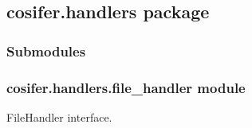 \documentclass[letterpaper,10pt,english]{sphinxmanual}
\begin{document}
\subsection{cosifer.handlers package}
\label{\detokenize{_modules/cosifer.handlers:cosifer-handlers-package}}\label{\detokenize{_modules/cosifer.handlers::doc}}

\subsubsection{Submodules}
\label{\detokenize{_modules/cosifer.handlers:submodules}}

\subsubsection{cosifer.handlers.file\_handler module}
\label{\detokenize{_modules/cosifer.handlers:module-cosifer.handlers.file_handler}}\label{\detokenize{_modules/cosifer.handlers:cosifer-handlers-file-handler-module}}
FileHandler interface.
\end{document}
